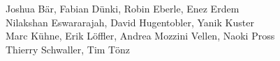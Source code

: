 %
%
%
Joshua Bär,			%
Fabian Dünki,			%
Robin Eberle,			%
Enez Erdem%
\\
Nilakshan Eswararajah,		%
David Hugentobler,		%
Yanik Kuster%
\\
Marc Kühne,			%
Erik Löffler,			%
Andrea Mozzini Vellen,		%
Naoki Pross%
\\
Thierry Schwaller,		%
Tim Tönz			%

